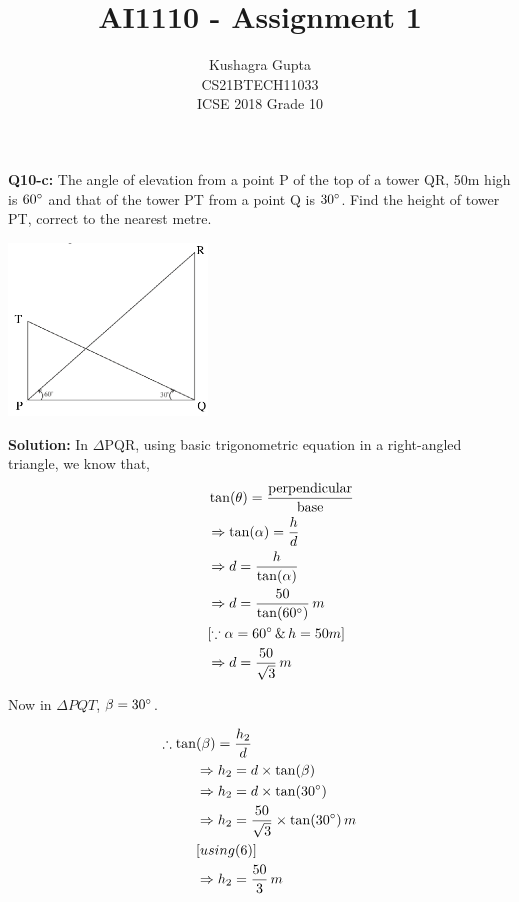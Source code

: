 \documentclass[journal,12pt,twocolumn]{IEEEtran}
\begin{document}
\newcommand{\solution}{\noindent \textbf{Solution: }}

\graphicspath{{figures/}}
\title{AI1110 - Assignment 1}

\author{Kushagra Gupta \\ \normalsize CS21BTECH11033  \\ \Large ICSE 2018 Grade 10}
\date{}
\maketitle
\begin{flushleft}
\textbf{Q10-c:}
The angle of elevation from a point P of the top of a tower QR, 50m high is $60\degree$ and that of the
tower PT from a point Q is $30\degree$. Find the height of tower PT, correct to the nearest metre.

\begin{center}
\includegraphics[width=150pt]{figure.png}
\end{center}
\begin{table}[ht!]
    
    \caption{}
	\label{table:table1}
\end{table}
\solution In $\Delta$PQR, using basic trigonometric equation in a right-angled triangle, we know that,
\begin{align}
&\tan(\theta)=\frac{\text{perpendicular}}{\text{base}}\\
\hspace{30pt}&\Rightarrow\tan(\alpha) = \frac{h}{d} \\
&\Rightarrow d = \frac{h}{\tan(\alpha)} \\
&\Rightarrow d = \frac{50}{\tan(60\degree)}\, m \\
&[\because \alpha = 60\degree \, \& \, h = 50m] \\
&\Rightarrow d = \frac{50}{\sqrt{3}}\, m
\end{align} 

Now in $\Delta PQT$, $\beta = 30\degree$.

\begin{align}
\therefore \tan&(\beta) = \frac{h_2}{d} \\
&\Rightarrow h_2 = d \times \tan(\beta)\\
&\Rightarrow h_2 = d \times \tan(30 \degree)\\
&\Rightarrow h_2 = \frac{50}{\sqrt{3}} \times \tan(30 \degree) \, m \\
&[using (6)]\\
&\Rightarrow h_2 = \frac{50}{3}\, m
\end{align}


\end{flushleft}
\end{document}
